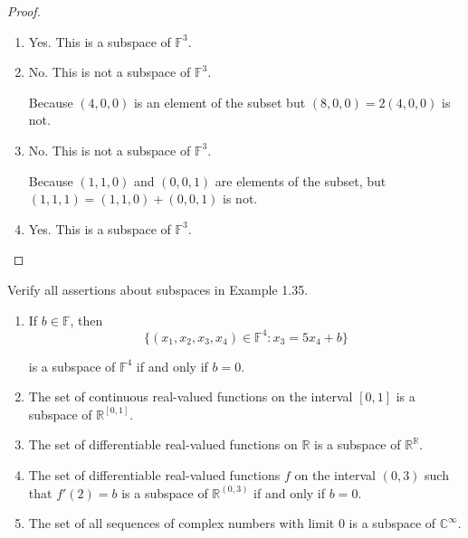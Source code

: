 \begin{proof}
    \begin{enumerate}[label={(\alph*)}]
        \item Yes. This is a subspace of $\mathbb{F}^{3}$.
        \item No. This is not a subspace of $\mathbb{F}^{3}$.

              Because $(4, 0, 0)$ is an element of the subset but $(8, 0, 0) = 2(4, 0, 0)$ is not.
        \item No. This is not a subspace of $\mathbb{F}^{3}$.

              Because $(1, 1, 0)$ and $(0, 0, 1)$ are elements of the subset, but $(1, 1, 1) = (1, 1, 0) + (0, 0, 1)$ is not.
        \item Yes. This is a subspace of $\mathbb{F}^{3}$.
    \end{enumerate}
\end{proof}

\begin{exercise}
    Verify all assertions about subspaces in Example 1.35.
    \begin{enumerate}[label={(\alph*)}]
        \item If $b\in\mathbb{F}$, then
              \[
                  \{ (x_{1}, x_{2}, x_{3}, x_{4})\in \mathbb{F}^{4}: x_{3} = 5x_{4} + b \}
              \]

              is a subspace of $\mathbb{F}^{4}$ if and only if $b = 0$.
        \item The set of continuous real-valued functions on the interval $[0, 1]$ is a subspace of $\mathbb{R}^{[0,1]}$.
        \item The set of differentiable real-valued functions on $\mathbb{R}$ is a subspace of $\mathbb{R}^{\mathbb{R}}$.
        \item The set of differentiable real-valued functions $f$ on the interval $(0, 3)$ such that $f'(2) = b$ is a subspace of $\mathbb{R}^{(0, 3)}$ if and only if $b = 0$.
        \item The set of all sequences of complex numbers with limit $0$ is a subspace of $\mathbb{C}^{\infty}$.
    \end{enumerate}
\end{exercise}

